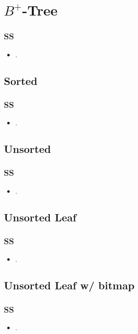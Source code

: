 \section{$B^+$-Tree}

\begin{frame}
\frametitle{SS}

\begin{itemize}
\item .
\end{itemize}

\end{frame}




\subsection{Sorted}

\begin{frame}
\frametitle{SS}

\begin{itemize}
\item .
\end{itemize}

\end{frame}



\subsection{Unsorted}
\begin{frame}
\frametitle{SS}

\begin{itemize}
\item .
\end{itemize}

\end{frame}



\subsection{Unsorted Leaf}

\begin{frame}
\frametitle{SS}

\begin{itemize}
\item .
\end{itemize}

\end{frame}




\subsection{Unsorted Leaf w/ bitmap}

\begin{frame}
\frametitle{SS}

\begin{itemize}
\item .
\end{itemize}

\end{frame}